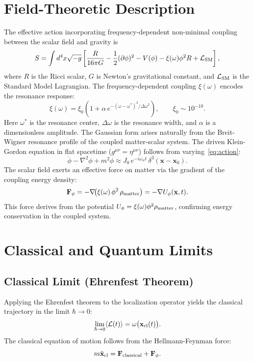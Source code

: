 \documentclass[conference,letterpaper,10pt]{IEEEtran}
\begin{document}
\section{Field-Theoretic Description}
The effective action incorporating frequency-dependent non-minimal coupling between the scalar field and gravity is
\begin{equation}
S = \int d^4x\sqrt{-g}\left[\frac{R}{16\pi G} - \frac12(\partial\phi)^2 - V(\phi) - \xi(\omega)\phi^2 R +
\mathcal{L}_{\rm SM}\right],
\label{eq:action}
\end{equation}
where \(R\) is the Ricci scalar, \(G\) is Newton's gravitational constant, and \(\mathcal{L}_{\rm SM}\) is the Standard
Model Lagrangian. The frequency-dependent coupling \(\xi(\omega)\) encodes the resonance response:
\begin{equation}
\xi(\omega) = \xi_0\!\left(1 + \alpha\, e^{-(\omega-\omega^*)^2/\Delta\omega^2}\right), \qquad \xi_0 \sim 10^{-10}.
\label{eq:xi}
\end{equation}
Here \(\omega^*\) is the resonance center, \(\Delta\omega\) is the resonance width, and \(\alpha\) is a dimensionless
amplitude. The Gaussian form arises naturally from the Breit-Wigner resonance profile of the coupled matter-scalar
system.
The driven Klein-Gordon equation in flat spacetime (\(g^{\mu\nu} = \eta^{\mu\nu}\)) follows from
varying~\eqref{eq:action}:
\begin{equation}
\ddot{\phi} - \nabla^2\phi + m^2\phi \approx J_0\,e^{-i\omega_w t}\,\delta^3(\mathbf{x}-\mathbf{x}_0).
\label{eq:klein-gordon}
\end{equation}
The scalar field exerts an effective force on matter via the gradient of the coupling energy density:
\begin{equation}
\mathbf{F}_\phi = -\nabla\!\bigl(\xi(\omega)\,\phi^2\,\rho_{\rm matter}\bigr) = -\nabla U_\phi(\mathbf{x},t).
\label{eq:force}
\end{equation}
This force derives from the potential \(U_\phi = \xi(\omega)\phi^2\rho_{\rm matter}\), confirming energy conservation in
 the coupled system.

\section{Classical and Quantum Limits}
\subsection{Classical Limit (Ehrenfest Theorem)}
Applying the Ehrenfest theorem to the localization operator yields the classical trajectory in the limit \(\hbar \to
0\):
\begin{equation}
\lim_{\hbar\to0}\langle\mathcal{L}(t)\rangle = \omega\bigl(\mathbf{x}_{\rm cl}(t)\bigr).
\label{eq:classical}
\end{equation}
The classical equation of motion follows from the Hellmann-Feynman force:
\begin{equation}
m\ddot{\mathbf{x}}_{\rm cl} = \mathbf{F}_{\rm classical} + \mathbf{F}_\phi.
\label{eq:eom}
\end{equation}
\end{document}
